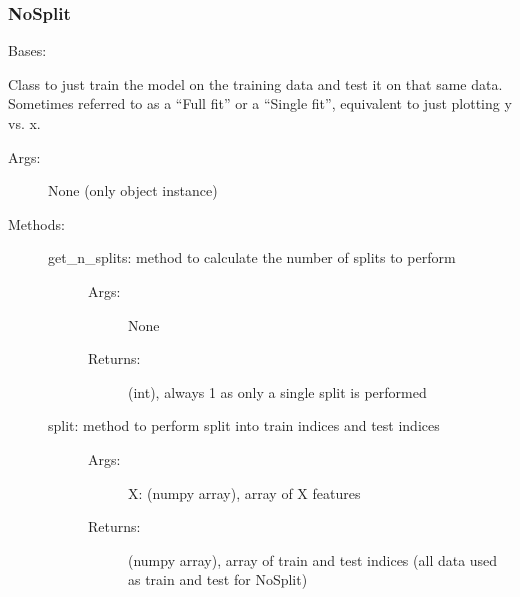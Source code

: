 \documentclass[letterpaper,10pt,english]{sphinxmanual}
\begin{document}
\subsubsection{NoSplit}
\label{\detokenize{api/mastml.data_splitters.NoSplit:nosplit}}\label{\detokenize{api/mastml.data_splitters.NoSplit::doc}}

\begin{fulllineitems}
\label{\detokenize{api/mastml.data_splitters.NoSplit:mastml.data_splitters.NoSplit}}
Bases: {\hyperref[\detokenize{api/mastml.data_splitters.BaseSplitter:mastml.data_splitters.BaseSplitter}]{}}

Class to just train the model on the training data and test it on that same data. Sometimes referred to as a “Full fit”
or a “Single fit”, equivalent to just plotting y vs. x.
\begin{description}
\item[{Args:}] \leavevmode
None (only object instance)

\item[{Methods:}] \leavevmode\begin{description}
\item[{get\_n\_splits: method to calculate the number of splits to perform}] \leavevmode\begin{description}
\item[{Args:}] \leavevmode
None

\item[{Returns:}] \leavevmode
(int), always 1 as only a single split is performed

\end{description}

\item[{split: method to perform split into train indices and test indices}] \leavevmode\begin{description}
\item[{Args:}] \leavevmode
X: (numpy array), array of X features

\item[{Returns:}] \leavevmode
(numpy array), array of train and test indices (all data used as train and test for NoSplit)

\end{description}


\end{description}
\end{description}
\end{fulllineitems}
\end{document}
